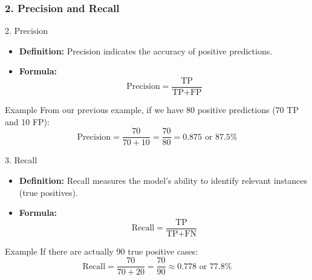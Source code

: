 \documentclass[aspectratio=169]{beamer}
\begin{document}
\begin{frame}[fragile]
    \frametitle{2. Precision and Recall}
    \begin{block}{2. Precision}
        \begin{itemize}
            \item \textbf{Definition:} Precision indicates the accuracy of positive predictions.
            \item \textbf{Formula:}
            \begin{equation}
            \text{Precision} = \frac{\text{TP}}{\text{TP} + \text{FP}}
            \end{equation}
        \end{itemize}
        \begin{block}{Example}
            From our previous example, if we have 80 positive predictions (70 TP and 10 FP):
            \[
            \text{Precision} = \frac{70}{70 + 10} = \frac{70}{80} = 0.875 \text{ or } 87.5\%
            \]
        \end{block}
    \end{block}
    
    \begin{block}{3. Recall}
        \begin{itemize}
            \item \textbf{Definition:} Recall measures the model's ability to identify relevant instances (true positives).
            \item \textbf{Formula:}
            \begin{equation}
            \text{Recall} = \frac{\text{TP}}{\text{TP} + \text{FN}}
            \end{equation}
        \end{itemize}
        \begin{block}{Example}
            If there are actually 90 true positive cases:
            \[
            \text{Recall} = \frac{70}{70 + 20} = \frac{70}{90} \approx 0.778 \text{ or } 77.8\%
            \]
        \end{block}
    \end{block}
\end{frame}
\end{document}
